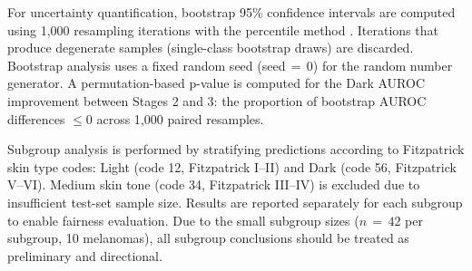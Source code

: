 For uncertainty quantification, bootstrap 95\% confidence intervals are computed using 1{,}000 resampling iterations with the percentile method \cite{Efron1986}. Iterations that produce degenerate samples (single-class bootstrap draws) are discarded. Bootstrap analysis uses a fixed random seed (seed\,$=$\,0) for the random number generator. A permutation-based p-value is computed for the Dark AUROC improvement between Stages 2 and 3: the proportion of bootstrap AUROC differences $\leq 0$ across 1{,}000 paired resamples.

Subgroup analysis is performed by stratifying predictions according to Fitzpatrick skin type codes: Light (code 12, Fitzpatrick I--II) and Dark (code 56, Fitzpatrick V--VI). Medium skin tone (code 34, Fitzpatrick III--IV) is excluded due to insufficient test-set sample size. Results are reported separately for each subgroup to enable fairness evaluation. Due to the small subgroup sizes ($n\,{=}\,42$ per subgroup, 10 melanomas), all subgroup conclusions should be treated as preliminary and directional.
